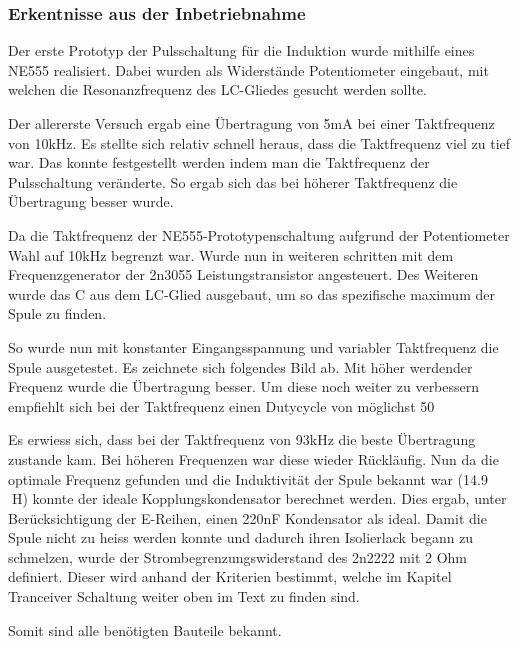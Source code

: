 \subsubsection*{Erkentnisse aus der Inbetriebnahme}\label{sec:energieuebertragung}

Der erste Prototyp der Pulsschaltung für die Induktion wurde mithilfe eines NE555 realisiert. Dabei wurden als Widerstände Potentiometer eingebaut, mit welchen die Resonanzfrequenz des LC-Gliedes gesucht werden sollte.

Der allererste Versuch ergab eine Übertragung von 5mA bei einer Taktfrequenz von 10kHz. Es stellte sich relativ schnell heraus, dass die Taktfrequenz viel zu tief war. Das konnte festgestellt werden indem man die Taktfrequenz der Pulsschaltung veränderte. So ergab sich das bei höherer Taktfrequenz die Übertragung besser wurde.

Da die Taktfrequenz der NE555-Prototypenschaltung aufgrund der Potentiometer Wahl auf 10kHz begrenzt war. Wurde nun in weiteren schritten mit dem Frequenzgenerator der 2n3055 Leistungstransistor angesteuert. Des Weiteren wurde das C aus dem LC-Glied ausgebaut, um so das spezifische maximum der Spule zu finden.

So wurde nun mit konstanter Eingangsspannung und variabler Taktfrequenz die Spule ausgetestet. Es zeichnete sich folgendes Bild ab. Mit höher werdender Frequenz wurde die Übertragung besser. Um diese noch weiter zu verbessern empfiehlt sich bei der Taktfrequenz einen Dutycycle von möglichst 50%

Es erwiess sich, dass bei der Taktfrequenz von 93kHz die beste Übertragung zustande kam. Bei höheren Frequenzen war diese wieder Rückläufig. Nun da die optimale Frequenz gefunden und die Induktivität der Spule bekannt war (14.9 H) konnte der ideale Kopplungskondensator berechnet werden. Dies ergab, unter Berücksichtigung der E-Reihen, einen 220nF Kondensator als ideal. Damit die Spule nicht zu heiss werden konnte und dadurch ihren Isolierlack begann zu schmelzen, wurde der Strombegrenzungswiderstand des 2n2222 mit 2 Ohm definiert. Dieser wird anhand der Kriterien bestimmt, welche im Kapitel Tranceiver Schaltung weiter oben im Text zu finden sind.

Somit sind alle benötigten Bauteile bekannt.

